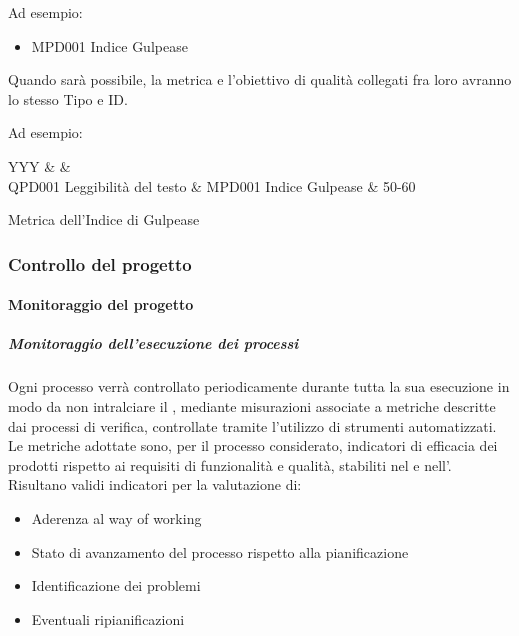 			Ad esempio:

			\begin{itemize}
				\item MPD001 Indice Gulpease
			\end{itemize}

			Quando sarà possibile, la metrica e l'obiettivo di qualità collegati fra loro avranno lo stesso Tipo e ID.

			Ad esempio:

			\begin{table}[H]
				\begin{detailtable}{\textwidth}{YYY}
					 &
					 &
					\\\toprule
					QPD001 Leggibilità del testo & MPD001 Indice Gulpease & 50-60\\
				\end{detailtable}
				\caption[Metrica Indice di Gulpease]{Metrica dell'Indice di Gulpease}%
			\end{table}

		\subsubsection{Controllo del progetto}

			\paragraph{Monitoraggio del progetto}

			\subparagraph{Monitoraggio dell'esecuzione dei processi}
			Ogni processo verrà controllato periodicamente durante tutta la sua esecuzione in modo da non intralciare il ,
			mediante misurazioni associate a metriche descritte dai processi di verifica, controllate tramite l'utilizzo di strumenti automatizzati.
			Le metriche adottate sono, per il processo considerato, indicatori di efficacia dei prodotti rispetto ai requisiti di funzionalità e qualità,
			stabiliti nel \Doc{\PdQv} e nell'\Doc{\AdRv}.\\
			Risultano validi indicatori per la valutazione di:
			\begin{itemize}
				\item Aderenza al way of working
				\item Stato di avanzamento del processo rispetto alla pianificazione
				\item Identificazione dei problemi
				\item Eventuali ripianificazioni
			\end{itemize}

